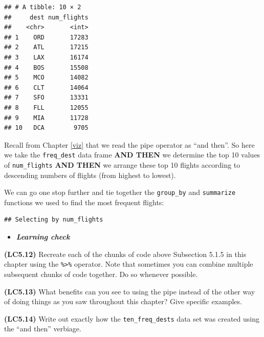 \documentclass[]{tufte-book}
\newenvironment{Shaded}{\begin{snugshade}}{\end{snugshade}}
\newcommand{\KeywordTok}[1]{\textcolor[rgb]{0.13,0.29,0.53}{\textbf{{#1}}}}
\newcommand{\DataTypeTok}[1]{\textcolor[rgb]{0.13,0.29,0.53}{{#1}}}
\newcommand{\DecValTok}[1]{\textcolor[rgb]{0.00,0.00,0.81}{{#1}}}
\newcommand{\StringTok}[1]{\textcolor[rgb]{0.31,0.60,0.02}{{#1}}}
\newcommand{\NormalTok}[1]{{#1}}
\newenvironment{rmdblock}[1]
  {\begin{shaded*}
  \begin{itemize}
  \renewcommand{\labelitemi}{
    \raisebox{-.7\height}[0pt][0pt]{
    }
  }
  \item
  }
  {
  \end{itemize}
  \end{shaded*}
  }
\newenvironment{learncheck}
  {\begin{rmdblock}{warning}}
  {\end{rmdblock}}
\begin{document}
\begin{verbatim}
## # A tibble: 10 × 2
##     dest num_flights
##    <chr>       <int>
## 1    ORD       17283
## 2    ATL       17215
## 3    LAX       16174
## 4    BOS       15508
## 5    MCO       14082
## 6    CLT       14064
## 7    SFO       13331
## 8    FLL       12055
## 9    MIA       11728
## 10   DCA        9705
\end{verbatim}

Recall from Chapter \ref{viz} that we read the pipe operator as ``and
then''. So here we take the \texttt{freq\_dest} data frame \textbf{AND
THEN} we determine the top 10 values of \texttt{num\_flights}
\textbf{AND THEN} we arrange these top 10 flights according to
descending numbers of flights (from highest to lowest).

We can go one stop further and tie together the \texttt{group\_by} and
\texttt{summarize} functions we used to find the most frequent flights:

\begin{Shaded}
\end{Shaded}

\begin{verbatim}
## Selecting by num_flights
\end{verbatim}

\begin{learncheck}
\textbf{\emph{Learning check}}
\end{learncheck}

\textbf{(LC5.12)} Recreate each of the chunks of code above Subsection
5.1.5 in this chapter using the \texttt{\%\textgreater{}\%} operator.
Note that sometimes you can combine multiple subsequent chunks of code
together. Do so whenever possible.

\textbf{(LC5.13)} What benefits can you see to using the pipe instead of
the other way of doing things as you saw throughout this chapter? Give
specific examples.

\textbf{(LC5.14)} Write out exactly how the \texttt{ten\_freq\_dests}
data set was created using the ``and then'' verbiage.
\end{document}
